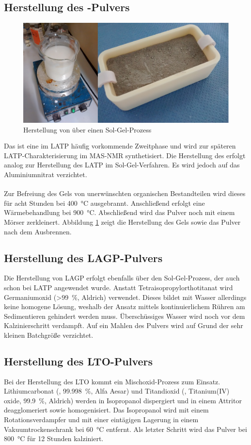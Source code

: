 \documentclass[a4paper, 11pt, headsepline,footsepline,twoside,abstract]{scrbook}
\begin{document}
\subsection{Herstellung des -Pulvers}
\label{praep_LiTiPO5}
\begin{figure}
	\centering
	\includegraphics[width=1.0\columnwidth]{images/SolGel.jpg}
	\caption{Herstellung von  über einen Sol-Gel-Prozess}
	\label{sol_gel}
\end{figure}
Das  ist eine im LATP häufig vorkommende Zweitphase und wird zur späteren LATP-Charakterisierung im MAS-NMR synthetisiert. Die Herstellung des  erfolgt analog zur Herstellung des LATP im Sol-Gel-Verfahren. Es wird jedoch auf das Aluminiumnitrat verzichtet.
\\\\
Zur Befreiung des Gels von unerwünschten organischen Bestandteilen wird dieses für acht Stunden bei \SI{400}{\celsius} ausgebrannt. Anschließend erfolgt eine Wärmebehandlung bei \SI{900}{\celsius}. Abschließend wird das Pulver noch mit einem Mörser zerkleinert. Abbildung \ref{sol_gel} zeigt die Herstellung des Gels sowie das Pulver nach dem Ausbrennen.
\subsection{Herstellung des LAGP-Pulvers}
\label{praep_LAGP}
Die Herstellung von LAGP erfolgt ebenfalls über den Sol-Gel-Prozess, der auch schon bei LATP angewendet wurde. Anstatt Tetra\-iso\-propyl\-ortho\-titanat wird Germaniumoxid (\SI{>99}{\percent}, Aldrich) verwendet. Dieses bildet mit Wasser allerdings keine homogene Lösung, weshalb der Ansatz mittels kontinuierlichem Rühren am Sedimentieren gehindert werden muss. Überschüssiges Wasser wird noch vor dem Kalzinierschritt verdampft. Auf ein Mahlen des Pulvers wird auf Grund der sehr kleinen Batchgröße verzichtet.
\subsection{Herstellung des LTO-Pulvers}
\label{praep_LTO}
Bei der Herstellung des LTO kommt ein Mischoxid-Prozess zum Einsatz. Lithiumcarbonat (, \SI{99.998}{\percent}, Alfa Aesar) und Titandioxid (, Titanium(IV) oxide, \SI{99.9}{\percent}, Aldrich) werden in Isopropanol dispergiert und in einem Attritor deagglomeriert sowie homogenisiert. Das Isopropanol wird mit einem Rotationsverdampfer und mit einer eintägigen Lagerung in einem Vakuumtrockenschrank bei \SI{60}{\celsius} entfernt. Als letzter Schritt wird das Pulver bei \SI{800}{\celsius} für 12 Stunden kalziniert.
\end{document}
